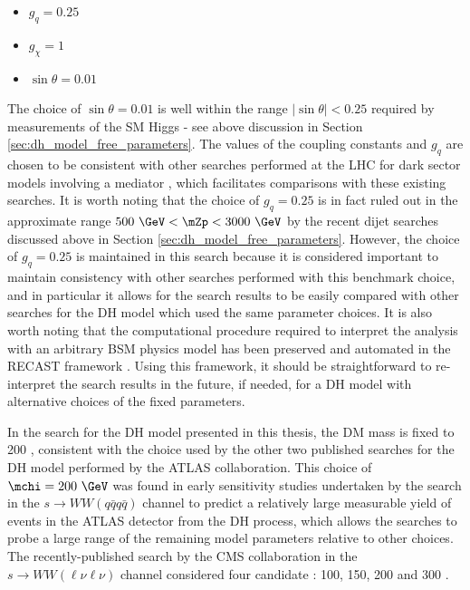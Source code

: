 \begin{itemize}
\item \(g_q=0.25\)
\item \(g_\chi=1\)
\item \(\sin\theta=0.01\)
\end{itemize}

The choice of \(\sin\theta=0.01\) is well within the range \(|\sin\theta|<0.25\) required by measurements of the SM Higgs - see above discussion in Section \ref{sec:dh_model_free_parameters}. The values of the coupling constants \gchi and \(g_q\) are chosen to be consistent with other searches performed at the LHC for dark sector models involving a \Zprime mediator \cite{LHC_benchmarks_2020}, which facilitates comparisons with these existing searches. It is worth noting that the choice of \(g_q=0.25\) is in fact ruled out in the approximate range \(500~\GeV < \mZp < 3000~\GeV\) by the recent dijet searches discussed above in Section \ref{sec:dh_model_free_parameters}. However, the choice of \(g_q=0.25\) is maintained in this search because it is considered important to maintain consistency with other searches performed with this benchmark choice, and in particular it allows for the search results to be easily compared with other searches for the DH model which used the same parameter choices. It is also worth noting that the computational procedure required to interpret the analysis with an arbitrary BSM physics model has been preserved and automated in the RECAST framework \cite{Cranmer2011}. Using this framework, it should be straightforward to re-interpret the search results in the future, if needed, for a DH model with alternative choices of the fixed parameters. 

In the search for the DH model presented in this thesis, the DM mass \mchi is fixed to 200 \GeV, consistent with the choice used by the other two published searches for the DH model \cite{ATL-PHYS-PUB-2019-032,monos_had_paper} performed by the ATLAS collaboration. This choice of \(\mchi=200~\GeV\) was found in early sensitivity studies undertaken by the search in the \(s\rightarrow WW(q\bar{q}q\bar{q})\) channel \cite{monos_had_paper} to predict a relatively large measurable yield of events in the ATLAS detector from the DH process, which allows the searches to probe a large range of the remaining model parameters relative to other \mchi choices. The recently-published search by the CMS collaboration in the \(s\rightarrow WW(\ell\nu\ell\nu)\) channel \cite{cms_monos_lep} considered four candidate \mchi: 100, 150, 200 and 300 \GeV. 

